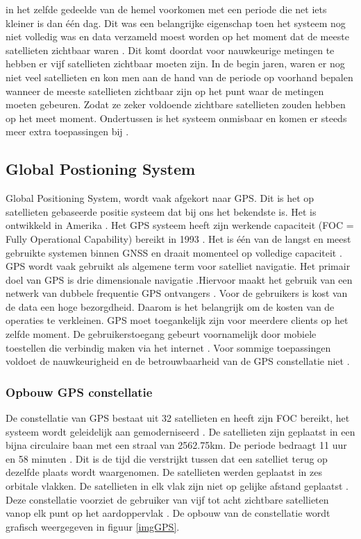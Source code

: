 in het zelfde gedeelde van de hemel voorkomen met een periode die net iets kleiner is dan \'e\'en dag. Dit was een belangrijke eigenschap toen het systeem nog niet volledig was en data verzameld moest worden op het moment dat de meeste satellieten zichtbaar waren \cite{LBibGNSS7}. Dit komt doordat voor nauwkeurige metingen te hebben er vijf satellieten zichtbaar moeten zijn. In de begin jaren, waren er nog niet veel satellieten en kon men aan de hand van de periode op voorhand bepalen wanneer de meeste satellieten zichtbaar zijn op het punt waar de metingen moeten gebeuren. Zodat ze zeker voldoende zichtbare satellieten zouden hebben op het meet moment. Ondertussen is het systeem onmisbaar en komen er steeds meer extra toepassingen bij \cite{LBibGNSS8}.

\subsection{Global Postioning System}
\label{LGPS} 
Global Positioning System, wordt vaak afgekort naar GPS. Dit is het op satellieten gebaseerde positie systeem dat bij ons het bekendste is. Het is ontwikkeld in Amerika \cite{LBibGNSS, LBibGNSS3}. Het GPS systeem heeft zijn werkende capaciteit (FOC = Fully Operational Capability) bereikt in 1993 \cite{LBibGPS4}. Het is \'e\'en van de langst en meest gebruikte systemen binnen GNSS en draait momenteel op volledige capaciteit \cite{LBibGNSS4,LBibGNSS8}. GPS wordt vaak gebruikt als algemene term voor satelliet navigatie. Het primair doel van GPS is drie dimensionale navigatie \cite{LBibGNSS8}.Hiervoor maakt het gebruik van een netwerk van dubbele frequentie GPS ontvangers \cite{LBibGPS5}. Voor de gebruikers is kost van de data een hoge bezorgdheid. Daarom is het belangrijk om de kosten van de operaties te verkleinen. GPS moet toegankelijk zijn voor meerdere clients op het zelfde moment. De gebruikerstoegang gebeurt voornamelijk door mobiele toestellen die verbindig maken via het internet \cite{LBibGPS}. Voor sommige toepassingen voldoet de nauwkeurigheid en de betrouwbaarheid van de GPS constellatie niet \cite{LBibGNSS6}.

\subsubsection{Opbouw GPS constellatie}
 De constellatie van GPS bestaat uit 32 satellieten en heeft zijn FOC bereikt, het systeem wordt geleidelijk aan gemoderniseerd \cite{LBibGNSS4}. De satellieten zijn geplaatst in een bijna circulaire baan met een straal van 2562.75km. De periode bedraagt 11 uur en 58 minuten \cite{LBibGNSS6,LBibGNSS8}. Dit is de tijd die verstrijkt tussen dat een satelliet terug op dezelfde plaats wordt waargenomen. De satellieten werden geplaatst in zes orbitale vlakken. De satellieten in elk vlak zijn niet op gelijke afstand geplaatst \cite{LBibGNSS6}. Deze constellatie voorziet de gebruiker van vijf tot acht zichtbare satellieten vanop elk punt op het aardoppervlak \cite{LBibGNSS8}. De opbouw van de constellatie wordt grafisch weergegeven in figuur \ref{imgGPS}.
 
